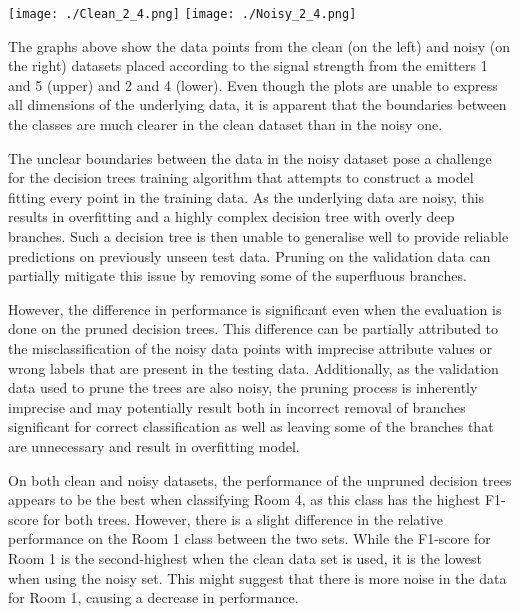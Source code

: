 \documentclass[11pt, a4paper]{article}
\begin{document}
  \texttt{[image: ./Clean\_2\_4.png]}
  \texttt{[image: ./Noisy\_2\_4.png]}

  The graphs above show the data points from the clean (on the left) and
  noisy (on the right) datasets placed according to the signal strength
  from the emitters 1 and 5 (upper) and 2 and 4 (lower). Even though
  the plots are unable to express all dimensions of the underlying data,
  it is apparent that the boundaries between the classes are much
  clearer in the clean dataset than in the noisy one.
  \newline\noindent

  The unclear boundaries between the data in the noisy dataset pose
  a challenge for the decision trees training algorithm that attempts
  to construct a model fitting every point in the training data.
  As the underlying data are noisy, this results in overfitting
  and a highly complex decision tree with overly deep branches.
  Such a decision tree is then unable to generalise well to provide
  reliable predictions on previously unseen test data. Pruning on the
  validation data can partially mitigate this issue by removing
  some of the superfluous branches.
  \newline\noindent

  However, the difference in performance is significant even when
  the evaluation is done on the pruned decision trees. This difference
  can be partially attributed to the misclassification of the noisy data
  points with imprecise attribute values or wrong labels that are present
  in the testing data. Additionally, as the validation data used to
  prune the trees are also noisy, the pruning process is inherently
  imprecise and may potentially result both in incorrect removal of branches
  significant for correct classification as well as leaving some
  of the branches that are unnecessary and result in overfitting model.
  \newline\noindent

  On both clean and noisy datasets, the performance of the unpruned decision
  trees appears to be the best when classifying Room 4, as this
  class has the highest F1-score for both trees. However, there
  is a slight difference in the relative performance on the
  Room 1 class between the two sets. While the F1-score for Room 1
  is the second-highest when the clean data set is used, it is
  the lowest when using the noisy set. This might suggest that
  there is more noise in the data for Room 1, causing a decrease
  in performance.
\end{document}
